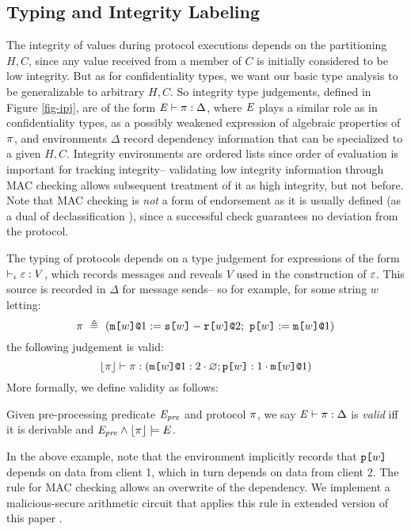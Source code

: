 \subsection{Typing and Integrity Labeling}

The integrity of values during protocol executions depends on the
partitioning $H,C$, since any value received from a member of $C$ is
initially considered to be low integrity. But as for confidentiality
types, we want our basic type analysis to be generalizable to
arbitrary $H,C$. So integrity type judgements, defined in Figure
\ref{fig-ipj}, are of the form $\mathit{E} \vdash \pi : \Delta$, where
$\mathit{E}$ plays a similar role as in confidentiality types, as a possibly
weakened expression of algebraic properties of $\pi$, and
environments $\Delta$ record dependency information that can be
specialized to a given $H,C$. Integrity environments are ordered lists
since order of evaluation is important for tracking integrity--
validating low integrity information through MAC checking allows
subsequent treatment of it as high integrity, but not before. Note
that MAC checking is \emph{not} a form of endorsement as it is usually
defined (as a dual of declassification
\cite{sabelfeld2009declassification}), since a successful check
guarantees no deviation from the protocol.

The typing of protocols depends on a type judgement for expressions
of the form $\vdash_{\iota} \varepsilon : V$, which records
messages and reveals $V$ used in the construction of $\varepsilon$.
This source is recorded in $\Delta$ for message sends-- so for
example, for some string $w$ letting:
$$
\prog\ \defeq\ (\xassign{\mx{w}{1}}{\secret{w} - \flip{w}}{2};\ \rvl{w} := \mx{w}{1})
$$
the following judgement is valid:
$$
\lfloor \pi \rfloor \vdash \pi : (\texttt{m[}w\texttt{]}\texttt{@}1 : 2 \cdot \varnothing; \texttt{p[}w\texttt{]} : 1 \cdot \texttt{m[}w\texttt{]}\texttt{@}1)
$$
More formally, we define validity as follows:
\begin{definition}
  Given pre-processing predicate $\mathit{E}_{\mathit{pre}}$ and protocol $\pi$, 
  we say $\mathit{E} \vdash \pi : \Delta$ is \emph{valid}
  iff it is derivable and $\mathit{E}_{\mathit{pre}} \wedge \lfloor \pi \rfloor \models E$.
\end{definition}

In the above example, note that the environment implicitly records
that $\texttt{p[}w\texttt{]}$ depends on data from client 1, which in turn
depends on data from client 2. The rule for MAC
checking allows an overwrite of the dependency. We implement
a malicious-secure arithmetic circuit that
applies this rule in extended version of
this paper \cite{skalka2025smtboostedsecuritytypeslowlevel}.

